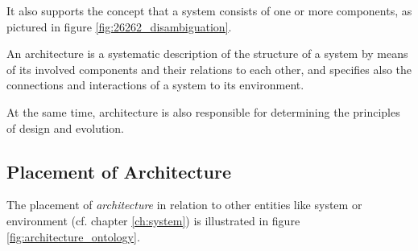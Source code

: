 It also supports the concept that a system consists of one or more components, as pictured in figure \ref{fig:26262_disambiguation}.

\begin{myquote}
An architecture is a systematic description of the structure of a system by means of its involved components and their relations to each other, and specifies also the connections and interactions of a system to its environment.

At the same time, architecture is also responsible for determining the principles of design and evolution.
\end{myquote}


\subsection{Placement of Architecture}
The placement of \emph{architecture} in relation to other entities like system or environment (cf. chapter \ref{ch:system}) is illustrated in figure \ref{fig:architecture_ontology}. 

